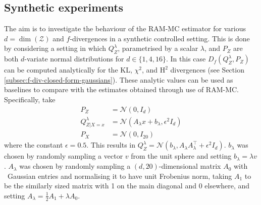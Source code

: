 \subsection{Synthetic experiments}\label{section:synth-exps}
The aim is to investigate the behaviour of the RAM-MC estimator for various $d=\dim(\mathcal{Z})$ and $f$-divergences in a synthetic controlled setting. 
This is done by considering a setting in which $Q^{\lambda}_Z$, parametrised by a scalar $\lambda$, and $P_Z$ are both $d$-variate normal distributions for $d\in\{1, 4, 16\}$.
In this case $D_f(Q^\lambda_Z, P_Z)$ can be computed analytically for the KL, $\chi^2$, and $\mathrm{H}^2$ divergences (see Section \ref{subsec:f-div-closed-form-gaussians}).
These analytic values can be used as baselines to compare with the estimates obtained through use of RAM-MC. 
Specifically, take 
\begin{align*}
P_Z &= \mathcal{N}(0, I_d) \\
Q^\lambda_{Z|X=x} &= \mathcal{N}\left(A_\lambda x + b_\lambda, \epsilon^2 I_d \right) \\
P_X &= \mathcal{N}\left(0, I_{20} \right)
\end{align*}
where the constant $\epsilon=0.5$.
This results in $Q^\lambda_Z = \mathcal{N}\left(b_\lambda,  A_\lambda A_\lambda^\intercal + \epsilon^2 I_d \right)$. 
$b_\lambda$ was chosen by randomly sampling a vector $v$ from the unit sphere and setting $b_\lambda = \lambda v$. 
$A_\lambda$ was chosen by randomly sampling a $(d,20)$-dimensional matrix $A_0$ with \iid~Gaussian entries and normalising it to have unit Frobenius norm, taking $A_1$ to be the similarly sized matrix with 1 on the main diagonal and 0 elsewhere, and setting $A_\lambda = \frac{1}{2}A_1 + \lambda A_0$.

